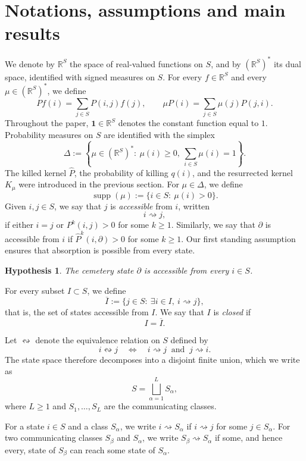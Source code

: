 \documentclass[10pt,letterpaper]{article}
\newtheorem{hypothesis}{Hypothesis}
\theoremstyle{compactplain}
\theoremstyle{compactdefinition}
\DeclareMathOperator{\supp}{supp}
\newcommand{\RR}{\mathbb R}
\newcommand{\1}{\mathds{1}}
\begin{document}
\section{Notations, assumptions and main results}\label{sec:notation-results}


 We denote by \(\RR^S\) the space of real-valued functions on \(S\), and by \((\RR^S)^*\) its dual space, identified with signed measures on \(S\). For every \(f\in\RR^S\) and every \(\mu\in(\RR^S)^*\), we define
\[
Pf(i)=\sum_{j\in S}P(i,j)f(j),
\qquad
\mu P(i)=\sum_{j\in S}\mu(j)P(j,i).
\]
Throughout the paper, \(\mathbf 1\in\RR^S\) denotes the constant function equal to \(1\). Probability measures on \(S\) are identified with the simplex
\[
\Delta:=\left\{\mu\in(\RR^S)^*:\ \mu(i)\geq0,\ \sum_{i\in S}\mu(i)=1\right\}.
\]
The killed kernel \(\widehat P\), the probability of killing \(q(i)\), and the resurrected kernel \(K_\mu\) were introduced in the previous section. For \(\mu\in\Delta\), we define
\[
\supp(\mu):=\{i\in S:\ \mu(i)>0\}.
\]
Given \(i,j\in S\), we say that \(j\) is \emph{accessible} from \(i\), written
\[
i\rightsquigarrow j,
\]
if either \(i=j\) or \(P^k(i,j)>0\) for some \(k\geq1\). Similarly, we say that \(\partial\) is accessible from \(i\) if $\widehat P^k(i,\partial)>0$ for some \(k\geq1\). Our first standing assumption ensures that absorption is possible from every state.

\begin{hypothesis}\label{hyp:main}
The cemetery state \(\partial\) is accessible from every \(i\in S\).
\end{hypothesis}


For every subset \(I\subset S\), we define 
\[
\overline I:=\{j\in S:\ \exists i\in I,\ i\rightsquigarrow j\},
\]
that is, the set of states accessible from \(I\). We say that \(I\) is \emph{closed} if
\[
I=\overline I.
\]

Let \(\leftrightsquigarrow\) denote the equivalence relation on \(S\) defined by
\[
i\leftrightsquigarrow j
\quad\Longleftrightarrow\quad
i\rightsquigarrow j
\ \text{ and }\
j\rightsquigarrow i.
\]
The state space therefore decomposes into a disjoint finite union, which we
write as
\begin{equation}\label{eq:classes}
    S=\bigsqcup_{\alpha=1}^L S_\alpha,
\end{equation}
where \(L\geq1\) and \(S_1,\ldots,S_L\) are the communicating classes.

For a state \(i\in S\) and a class \(S_\alpha\), we write 
\(
i\rightsquigarrow S_\alpha
\)
if \(i\rightsquigarrow j\) for some \(j\in S_\alpha\). For two communicating
classes \(S_\beta\) and \(S_\alpha\), we write
\(
S_\beta\rightsquigarrow S_\alpha
\)
if some, and hence every, state of \(S_\beta\) can reach some state of
\(S_\alpha\).
\end{document}
